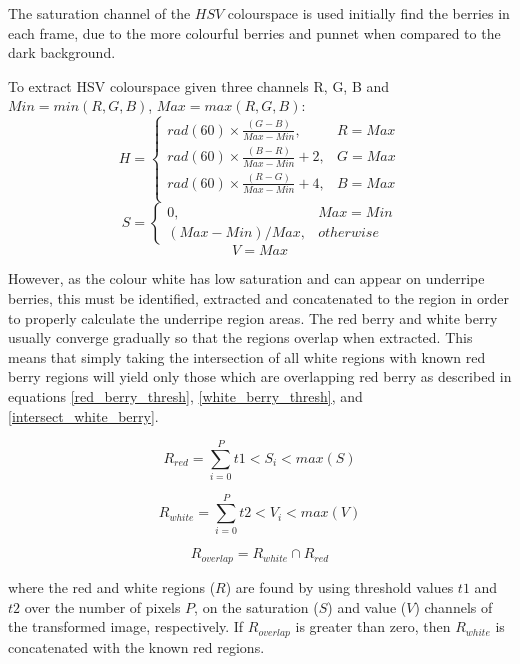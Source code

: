 \documentclass[fleqn,twoside]{article}
\begin{document}
The saturation channel of the $HSV$ colourspace is used initially find the berries in each frame, due to the more colourful berries and punnet when compared to the dark background. 

To extract HSV colourspace given three channels R, G, B and $Min = min(R, G, B)$, $Max = max(R, G, B)$:
\begin{equation}
H = 
\begin{cases} 
rad(60) \times \frac{(G-B)}{Max-Min}, & R=Max \\
rad(60) \times \frac{(B-R)}{Max-Min} + 2, & G=Max \\
rad(60) \times \frac{(R-G)}{Max-Min} + 4, & B=Max \\   
\end{cases}
\end{equation}
\begin{equation}
S = 
\begin{cases} 
0, & Max=Min \\   
(Max-Min)/Max, & otherwise        
\end{cases}
\end{equation}
\begin{equation}
V = Max
\end{equation}


However, as the colour white has low saturation and can appear on underripe berries, this must be identified, extracted and concatenated to the region in order to properly calculate the underripe region areas. The red berry and white berry usually converge gradually so that the regions overlap when extracted. This means that simply taking the intersection of all white regions with known red berry regions will yield only those which are overlapping red berry as described in equations \ref{red_berry_thresh}, \ref{white_berry_thresh}, and \ref{intersect_white_berry}.

\begin{equation}
R_{red} = \sum_{i=0}^{P}t1<S_i<max(S)
\label{red_berry_thresh}
\end{equation}

\begin{equation}
R_{white} = \sum_{i=0}^{P}t2<V_i<max(V)
\label{white_berry_thresh}
\end{equation}

\begin{equation}
R_{overlap} = R_{white} \cap R_{red}
\label{intersect_white_berry}
\end{equation}

where the red and white regions ($R$) are found by using threshold values $t1$ and $t2$ over the number of pixels $P$, on the saturation ($S$) and value ($V$) channels of the transformed image, respectively. If $R_{overlap}$ is greater than zero, then $R_{white}$ is concatenated with the known red regions. 
\end{document}
